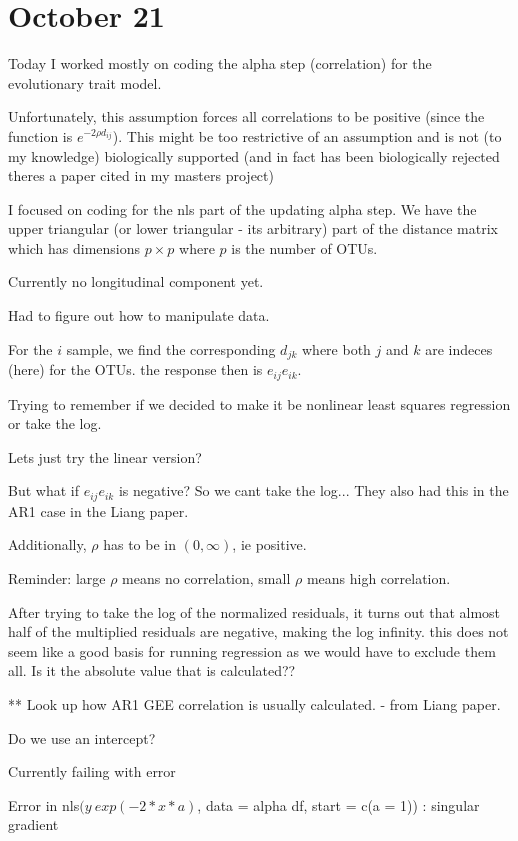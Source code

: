 \documentclass[10pt]{article}
\begin{document}
\section{October 21}


Today I worked mostly on coding the alpha step (correlation) for the evolutionary trait model.

Unfortunately, this assumption forces all correlations to be positive (since the function is $e^{-2\rho d_{ij}}$). This might be too restrictive of an assumption and is not (to my knowledge) biologically supported (and in fact has been biologically rejected theres a paper cited in my masters project)

I focused on coding for the nls part of the updating alpha step. We have the upper triangular (or lower triangular - its arbitrary) part of the distance matrix which has dimensions $p \times p$ where $p$ is the number of OTUs.

Currently no longitudinal component yet.

Had to figure out how to manipulate data.

For the $i$ sample, we find the corresponding $d_{jk}$ where both $j$ and  $k$ are indeces (here) for the OTUs. the response then is $e_{ij}e_{ik}$.

Trying to remember if we decided to make it be nonlinear least squares regression or take the log.

Lets just try the linear version?

But what if $e_{ij}e_{ik}$ is negative? So we cant take the log... They also had this in the AR1 case in the Liang paper.

Additionally, $\rho$ has to be in $(0,\infty)$, ie positive.

Reminder: large $\rho$ means no correlation, small $\rho$ means high correlation.

After trying to take the log of the normalized residuals, it turns out that almost half of the multiplied residuals are negative, making the log infinity. this does not seem like a good basis for running regression as we would have to exclude them all. Is it the absolute value that is calculated??

** Look up how AR1 GEE correlation is usually calculated. - from Liang paper.

Do we use an intercept?

Currently failing with error

Error in nls$(y ~ exp(-2 * x * a)$, data = alpha df, start = c(a = 1)) :
  singular gradient
\end{document}
